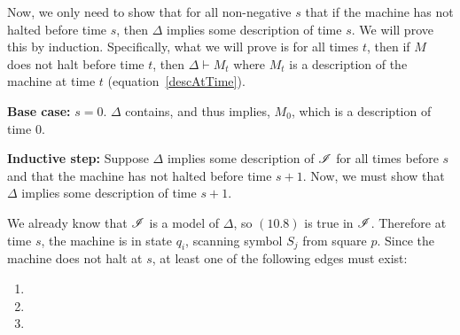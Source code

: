 Now, we only need to show that for all non-negative $s$ that if the machine has not halted before time $s$, then $\Delta$ implies some description of time $s$. We will prove this by induction. Specifically, what we will prove is for all times $t$, then if $M$ does not halt before time $t$, then $\Delta \vdash M_t$ where $M_t$ is a description of the machine at time $t$ (equation~\ref{descAtTime}).

\noindent\textbf{Base case:} $s=0$. $\Delta$ contains, and thus implies, $M_0$, which is a description of time $0$.

\noindent\textbf{Inductive step:} Suppose $\Delta$ implies some description of $\mathscr{I}$ for all times before $s$ and that the machine has not halted before time $s+1$. Now, we must show that $\Delta$ implies some description of time $s+1$.

We already know that $\mathscr{I}$ is a model of $\Delta$, so $(10.8)$ is true in $\mathscr{I}$. Therefore at time $s$, the machine is in state $q_i$, scanning symbol $S_j$ from square $p$. Since the machine does not halt at $s$, at least one of the following edges must exist:
\begin{enumerate}
\item {}
\item {}
\item {}
\end{enumerate}

